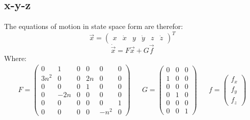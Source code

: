 \documentclass[11pt, a4paper]{article}
\begin{document}
\subsection{x-y-z}
The equations of motion in state space form are therefor:
\begin{equation}
    \vec{x} = \begin{pmatrix}
        x & \dot{x} & y & \dot{y} & z & \dot{z}
    \end{pmatrix}^T
\end{equation}
\begin{equation}
    \dot{\vec{x}}=F\vec{x}+G\vec{f}
\end{equation}
Where:
\begin{equation}
    \begin{matrix}
        F=\begin{pmatrix}
            0 & 1 & 0 & 0 & 0 & 0 \\
            3n^2 & 0 & 0 & 2n & 0 & 0 \\
            0 & 0 & 0 & 1 & 0 & 0 \\
            0 & -2n & 0 & 0 & 0 & 0 \\
            0 & 0 & 0 & 0 & 0 & 1 \\
            0 & 0 & 0 & 0 & -n^2 & 0 
        \end{pmatrix} && G=\begin{pmatrix}
            0 & 0 & 0\\
            1 & 0 & 0\\
            0 & 0 & 0\\
            0 & 1 & 0\\
            0 & 0 & 0\\
            0 & 0 & 1
        \end{pmatrix} && f=\begin{pmatrix}
            f_x\\f_y\\f_z
        \end{pmatrix}
    \end{matrix}
\end{equation}
\newpage
\end{document}
